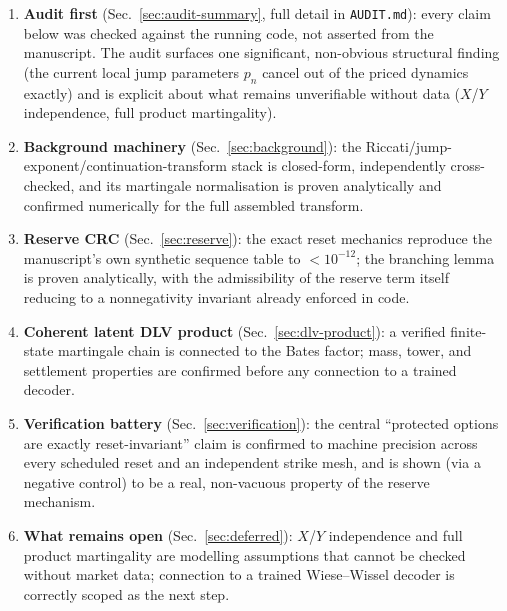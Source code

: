 \documentclass[11pt]{article}
\begin{document}
\begin{enumerate}
\item \textbf{Audit first} (Sec.~\ref{sec:audit-summary}, full detail in
  \texttt{AUDIT.md}): every claim below was checked against the running
  code, not asserted from the manuscript. The audit surfaces one
  significant, non-obvious structural finding (the current local jump
  parameters $p_n$ cancel out of the priced dynamics exactly) and is
  explicit about what remains unverifiable without data ($X$/$Y$
  independence, full product martingality).
\item \textbf{Background machinery} (Sec.~\ref{sec:background}): the
  Riccati/jump-exponent/continuation-transform stack is closed-form,
  independently cross-checked, and its martingale normalisation is proven
  analytically and confirmed numerically for the full assembled transform.
\item \textbf{Reserve CRC} (Sec.~\ref{sec:reserve}): the exact reset
  mechanics reproduce the manuscript's own synthetic sequence table to
  $<10^{-12}$; the branching lemma is proven analytically, with the
  admissibility of the reserve term itself reducing to a nonnegativity
  invariant already enforced in code.
\item \textbf{Coherent latent DLV product} (Sec.~\ref{sec:dlv-product}): a
  verified finite-state martingale chain is connected to the Bates factor;
  mass, tower, and settlement properties are confirmed before any
  connection to a trained decoder.
\item \textbf{Verification battery} (Sec.~\ref{sec:verification}): the
  central ``protected options are exactly reset-invariant'' claim is
  confirmed to machine precision across every scheduled reset and an
  independent strike mesh, and is shown (via a negative control) to be a
  real, non-vacuous property of the reserve mechanism.
\item \textbf{What remains open} (Sec.~\ref{sec:deferred}): $X$/$Y$
  independence and full product martingality are modelling assumptions
  that cannot be checked without market data; connection to a trained
  Wiese--Wissel decoder is correctly scoped as the next step.
\end{enumerate}








\end{document}
